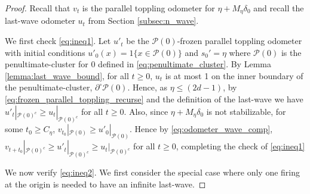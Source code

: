 \documentclass[aap]{imsart}
\begin{document}
\begin{proof}
	
	Recall that $v_t$ is the parallel toppling odometer for $\eta + M_{\eta}  \delta_0$ and recall the last-wave odometer $u_t$ from Section \ref{subsec:n_wave}.
	
	We first check \eqref{eq:ineq1}. 
	Let $u'_t$ be the $\mathcal{P}(0)$-frozen parallel toppling odometer with initial conditions $u'_0(x) = 1\{x \in \mathcal{P}(0)\}$ and
	$s_0' = \eta$ 
	where $\mathcal{P}(0)$ is the penultimate-cluster for $0$ defined in \eqref{eq:penultimate_cluster}.
	By Lemma \ref{lemma:last_wave_bound}, for all $t \geq 0$, $u_{t}$ is at most 1 on the inner boundary of the penultimate-cluster, $\partial^{\circ} \mathcal{P}(0)$.  
	Hence, as $\eta \leq (2 d -1)$, 
	by \eqref{eq:frozen_parallel_toppling_recurse} and the definition of the last-wave we have $u'_t |_{\mathcal{P}(0)^c} \geq u_t |_{\mathcal{P}(0)^c}$ for all $t \geq 0$. Also, since $\eta + M_{\eta}  \delta_0$ is not stabilizable, for some $t_0 \geq C_{\eta}$, $v_{t_0} |_{\mathcal{P}(0)} \geq u'_{0} |_{\mathcal{P}(0)}$. 
	Hence by \eqref{eq:odometer_wave_comp}, $v_{t + t_0} |_{\mathcal{P}(0)^c} \geq u'_t |_{\mathcal{P}(0)^c} \geq u_t |_{\mathcal{P}(0)^c}$ for all $t \geq 0$, 
	completing the check of \eqref{eq:ineq1}
	

%	
	We now verify \eqref{eq:ineq2}. We first consider the special case where only
	one firing at the origin is needed to have an infinite last-wave. 
	

\end{proof}
\end{document}
